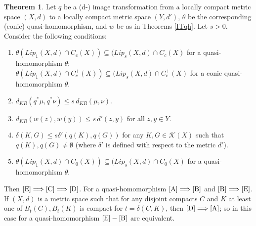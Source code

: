 \documentclass[sn-mathphys-num]{sn-jnl}%
\theoremstyle{thmstyleone}%
\theoremstyle{definition}
\newtheorem{theorem}{Theorem}%
\begin{document}
\begin{theorem} \label{sThe}
Let $q$ be a (d-) image transformation from a locally compact metric space $(X, d)$ to a
locally compact metric space $(Y, d')$, 
$\theta$ be the corresponding (conic)
quasi-homomorphism,  and $w$ be as in 
Theorems \ref{ITqh}. Let $ s > 0$. Consider the following conditions:
\begin{enumerate}[label=(s\arabic*),ref=(s\arabic*)]
\item \label{E}
$\theta(Lip_1(X, d) \cap C_c(X)) \subseteq (Lip_s(X, d) \cap C_c(X)$ for a quasi-homomorphism $\theta$; \\
$\theta(Lip_1(X, d) \cap C_c^+(X)) \subseteq (Lip_s(X, d) \cap C_c^+(X)$ for a conic quasi-homomorphism $\theta$.
\item \label{C}
$d_{KR} (q^*\mu, q^*\nu) \le s\, d_{KR} (\mu, \nu)$.
\item \label{D}
$d_{KR} (w(z), w(y)) \le s\, d'(z,y)$ for all $z,y  \in Y$.
\item \label{A}
$\delta (K, G) \le s \delta' (q(K), q(G))$ for any $K, G \in \mathscr{K}(X)$ such that $q(K), q(G) \neq \emptyset$ (where $\delta'$ is defined with respect to the metric $d'$).
\item \label{B}
$\theta(Lip_1(X, d) \cap C_0(X)) \subseteq (Lip_s(X, d) \cap C_0(X)$ for a quasi-homomorphism $\theta$.
\end{enumerate}
Then $ \ref{E} \Longrightarrow  \ref{C} \Longrightarrow \ref{D}$. 
For a quasi-homomorphism  $ \ref{A} \Longrightarrow  \ref{B}$ and  $ \ref{B} \Longrightarrow  \ref{E}$. 
If $(X,d)$ is a metric space such that for any disjoint compacts $C$ and $K$ at least one of $B_t(C), B_t(K)$ is compact  for $ t = \delta(C,K)$, then 
$\ref{D} \Longrightarrow  \ref{A}$; so in this case  for a quasi-homomorphism $\ref{E} -\ref{B}$ are equivalent. 

\end{theorem}
\end{document}
